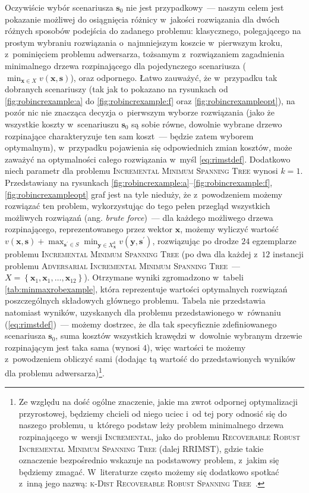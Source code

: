 Oczywiście wybór scenariusza $\textbf{s}_{0}$ nie jest przypadkowy~--- naszym celem jest pokazanie możliwej do osiągnięcia różnicy w~jakości rozwiązania dla dwóch różnych sposobów podejścia do zadanego problemu: klasycznego, polegającego na prostym wybraniu rozwiązania o~najmniejszym koszcie w~pierwszym kroku, z~pominięciem problemu adwersarza, tożsamym z~rozwiązaniem zagadnienia minimalnego drzewa rozpinającego dla pojedynczego scenariusza ($\min_{\textbf{x} \in X} v \left( \textbf{x}, \textbf{s} \right)$), oraz odpornego. 
Łatwo zauważyć, że w~przypadku tak dobranych scenariuszy (tak jak to pokazano na rysunkach od \ref{fig:robincrexample:a} do \ref{fig:robincrexample:f} oraz \ref{fig:robincrexampleopt}), na pozór nic nie znacząca decyzja o~pierwszym wyborze rozwiązania (jako że wszystkie koszty w~scenariuszu $\textbf{s}_{0}$ są sobie równe, dowolnie wybrane drzewo rozpinające charakteryzuje ten sam koszt~--- będzie zatem wyborem optymalnym), w~przypadku pojawienia się odpowiednich zmian kosztów, może zaważyć na optymalności całego rozwiązania w~myśl \ref{eq:rimstdef}.
Dodatkowo niech parametr dla problemu \textsc{Incremental Minimum Spanning Tree} wynosi $k = 1$.
Przedstawiany na rysunkach \ref{fig:robincrexample:a}--\ref{fig:robincrexample:f}, \ref{fig:robincrexampleopt} graf jest na tyle nieduży, że z~powodzeniem możemy rozwiązać ten problem, wykorzystując do tego pełen przegląd wszystkich możliwych rozwiązań (ang. \textit{brute force})~--- dla każdego możliwego drzewa rozpinającego, reprezentowanego przez wektor $\textbf{x}$, możemy wyliczyć wartość $v \left( \textbf{x}, \textbf{s} \right) + \max_{\textbf{s}^{\prime} \in S} \min_{\textbf{y} \in X^{k}_{\textbf{x}}} v \left( \textbf{y}, \textbf{s}^{\prime} \right)$, rozwiązując po drodze $24$ egzemplarze problemu \textsc{Incremental Minimum Spanning Tree} (po dwa dla każdej z~$12$ instancji problemu \textsc{Adversarial Incremental Minimum Spanning Tree}~--- $X = \left\{ \textbf{x}_{1}, \textbf{x}_{1}, \dots, \textbf{x}_{12} \right\}$).
Otrzymane wyniki zgromadzono w~tabeli \ref{tab:minmaxrobexample}, która reprezentuje wartości optymalnych rozwiązań poszczególnych składowych głównego problemu.
Tabela nie przedstawia natomiast wyników, uzyskanych dla problemu przedstawionego w~równaniu (\ref{eq:rimstdef})~--- możemy dostrzec, że dla tak specyficznie zdefiniowanego scenariusza $\textbf{s}_{0}$, suma kosztów wszystkich krawędzi w~dowolnie wybranym drzewie rozpinającym jest taka sama (wynosi $4$), więc wartości te możemy z~powodzeniem obliczyć sami (dodając tą wartość do przedstawionych wyników dla problemu adwersarza)\footnote{
	Ze względu na dość ogólne znaczenie, jakie ma zwrot odpornej optymalizacji przyrostowej, będziemy chcieli od niego uciec i~od tej pory odnosić się do naszego problemu, u~którego podstaw leży problem minimalnego drzewa rozpinającego w~wersji \textsc{Incremental}, jako do problemu \textsc{Recoverable Robust Incremental Minimum Spanning Tree} (dalej \textsc{RRIMST}), gdzie takie oznaczenie bezpośrednio wskazuje na podstawowy problem, z~jakim się będziemy zmagać.
	W~literaturze często możemy się dodatkowo spotkać z~inną jego nazwą: \textsc{k-Dist Recoverable Robust Spanning Tree}~\cite{Kasperski2014}.
}.

